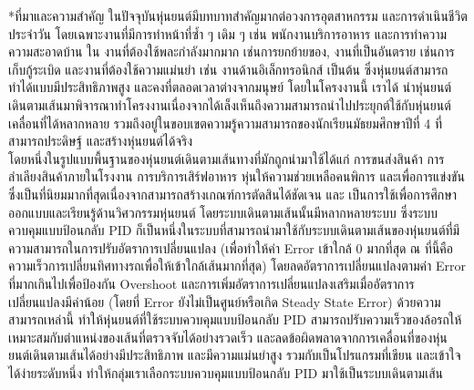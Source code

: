 \documentclass[14pt, fleqn, a4paper]{extarticle}
\makeatletter
\renewcommand\section{%
  \@ifstar{\flatsection}{\@section}%
}
\newcommand{\flatsection}[1]{%
   \par\medskip\noindent
   {\bfseries #1\par}
}
\makeatother
\begin{document}
\vspace{-0.5em}
\section*{ที่มาและความสำคัญ} \vspace{-0.5em}
ในปัจจุบันหุ่นยนต์มีบทบาทสำคัญมากต่อวงการอุตสาหกรรม และการดำเนินชีวิตประจำวัน โดยเฉพาะงานที่มีการทำหน้าที่ซ้ำ ๆ เดิม ๆ เช่น พนักงานบริการอาหาร และการทำความความสะอาดบ้าน ใน งานที่ต้องใช้พละกำลังมากมาก เช่นการยกย้ายของ, งานที่เป็นอันตราย เช่นการเก็บกู้ระเบิด และงานที่ต้องใช้ความแม่นยำ เช่น งานด้านอิเล็กทรอนิกส์ เป็นต้น ซึ่งหุ่นยนต์สามารถทำได้แบบมีประสิทธิภาพสูง และคงที่ตลอดเวลาต่างจากมนุษย์ 
โดยในโครงงานนี้ เราได้ นำหุ่นยนต์เดินตามเส้นมาพิจารณาทำโครงงานเนื่องจากได้เล็งเห็นถึงความสามารถนำไปประยุกต์ใช้กับหุ่นยนต์เคลื่อนที่ได้หลากหลาย รวมถึงอยู่ในขอบเขตความรู้ความสามารถของนักเรียนมัธยมศึกษาปีที่ 4 ที่สามารถประดิษฐ์ และสร้างหุ่นยนต์ได้จริง \\
\indent โดยหนึ่งในรูปแบบพื้นฐานของหุ่นยนต์เดินตามเส้นทางที่มักถูกนำมาใช้ได้แก่ การขนส่งสินค้า การลำเลียงสินค้าภายในโรงงาน การบริการเสิร์ฟอาหาร หุ่นให้ความช่วยเหลือคนพิการ และเพื่อการแข่งขันซึ่งเป็นที่นิยมมากที่สุดเนื่องจากสามารถสร้างเกณฑ์การตัดสินได้ชัดเจน และ เป็นการใช้เพื่อการศึกษาออกแบบและเรียนรู้ด้านวิศวกรรมหุ่นยนต์ 
โดยระบบเดินตามเส้นนั้นมีหลากหลายระบบ ซึ่งระบบควบคุมแบบป้อนกลับ PID ก็เป็นหนึ่งในระบบที่สามารถนำมาใช้กับระบบเดินตามเส้นของหุ่นยนต์ที่มีความสามารถในการปรับอัตราการเปลี่ยนแปลง (เพื่อทำให้ค่า Error เข้าใกล้ 0 มากที่สุด ณ ที่นี้คือความเร็วการเปลี่ยนทิศทางรถเพื่อให้เข้าใกล้เส้นมากที่สุด) โดยลดอัตราการเปลี่ยนแปลงตามค่า Error ที่มากเกินไปเพื่อป้องกัน Overshoot และการเพิ่มอัตราการเปลี่ยนแปลงเสริมเมื่ออัตราการเปลี่ยนแปลงมีค่าน้อย (โดยที่ Error ยังไม่เป็นศูนย์หรือเกิด Steady State Error) ด้วยความสามารถเหล่านี้ ทำให้หุ่นยนต์ที่ใช้ระบบควบคุมแบบป้อนกลับ PID สามารถปรับความเร็วของล้อรถให้เหมาะสมกับตำแหน่งของเส้นที่ตรวจจับได้อย่างรวดเร็ว และลดข้อผิดพลาดจากการเคลื่อนที่ของหุ่นยนต์เดินตามเส้นได้อย่างมีประสิทธิภาพ และมีความแม่นยำสูง รวมกับเป็นโปรแกรมที่เขียน และเข้าใจได้ง่ายระดับหนึ่ง ทำให้กลุ่มเราเลือกระบบควบคุมแบบป้อนกลับ PID มาใช้เป็นระบบเดินตามเส้น
\end{document}
